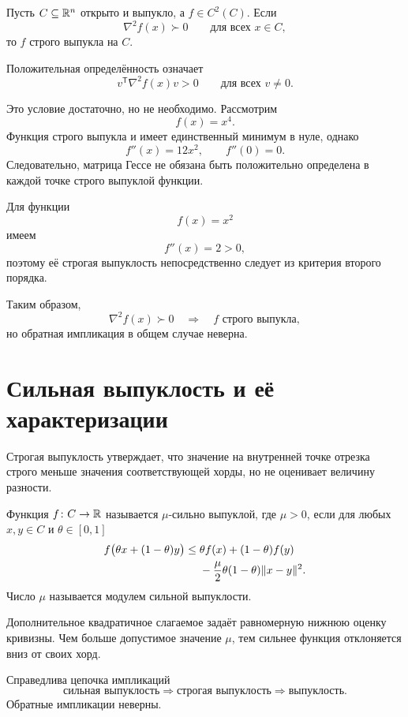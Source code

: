 \begin{theorem}
Пусть \(C\subseteq\mathbb{R}^n\) открыто и выпукло, а
\(f\in C^2(C)\). Если
\[
    \nabla^2 f(x)\succ0
    \qquad
    \text{для всех }x\in C,
\]
то \(f\) строго выпукла на \(C\).
\end{theorem}

Положительная определённость означает
\[
    v^{\mathsf T}\nabla^2f(x)v>0
    \qquad
    \text{для всех }v\ne0.
\]

Это условие достаточно, но не необходимо. Рассмотрим
\[
    f(x)=x^4.
\]
Функция строго выпукла и имеет единственный минимум в нуле, однако
\[
    f''(x)=12x^2,
    \qquad
    f''(0)=0.
\]
Следовательно, матрица Гессе не обязана быть положительно определена
в каждой точке строго выпуклой функции.

Для функции
\[
    f(x)=x^2
\]
имеем
\[
    f''(x)=2>0,
\]
поэтому её строгая выпуклость непосредственно следует из критерия
второго порядка.

Таким образом,
\[
    \nabla^2f(x)\succ0
    \quad\Longrightarrow\quad
    f\text{ строго выпукла},
\]
но обратная импликация в общем случае неверна.

\section{Сильная выпуклость и её характеризации}

Строгая выпуклость утверждает, что значение на внутренней точке
отрезка строго меньше значения соответствующей хорды, но не оценивает
величину разности.

\begin{definition}
Функция \(f\colon C\to\mathbb{R}\) называется \(\mu\)-сильно выпуклой,
где \(\mu>0\), если для любых \(x,y\in C\) и
\(\theta\in[0,1]\)
\[
\begin{aligned}
    f\bigl(\theta x+(1-\theta)y\bigr)
    \le{}&
    \theta f(x)+(1-\theta)f(y)
    \\
    &-
    \frac{\mu}{2}
    \theta(1-\theta)\lVert x-y\rVert^2.
\end{aligned}
\]
Число \(\mu\) называется модулем сильной выпуклости.
\end{definition}

Дополнительное квадратичное слагаемое задаёт равномерную нижнюю
оценку кривизны. Чем больше допустимое значение \(\mu\), тем сильнее
функция отклоняется вниз от своих хорд.

Справедлива цепочка импликаций
\[
    \text{сильная выпуклость}
    \Longrightarrow
    \text{строгая выпуклость}
    \Longrightarrow
    \text{выпуклость}.
\]
Обратные импликации неверны.

